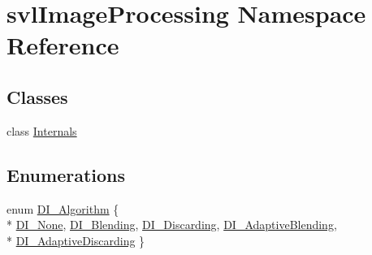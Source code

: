 \hypertarget{namespacesvl_image_processing}{}\section{svl\+Image\+Processing Namespace Reference}
\label{namespacesvl_image_processing}
\subsection*{Classes}
\begin{DoxyCompactItemize}
\item 
class \hyperlink{classsvl_image_processing_1_1_internals}{Internals}
\end{DoxyCompactItemize}
\subsection*{Enumerations}
\begin{DoxyCompactItemize}
\item 
enum \hyperlink{namespacesvl_image_processing_a52b75591f8aa2cf8a2b4ea843b2f864a}{D\+I\+\_\+\+Algorithm} \{ \\*
\hyperlink{namespacesvl_image_processing_a52b75591f8aa2cf8a2b4ea843b2f864aa73d04fb676b1d8a4eb2e107629637e10}{D\+I\+\_\+\+None}, 
\hyperlink{namespacesvl_image_processing_a52b75591f8aa2cf8a2b4ea843b2f864aa228be787d8eacef51545d7b0e5d834c6}{D\+I\+\_\+\+Blending}, 
\hyperlink{namespacesvl_image_processing_a52b75591f8aa2cf8a2b4ea843b2f864aa8c3cd58f7894507f4629c50b465d8623}{D\+I\+\_\+\+Discarding}, 
\hyperlink{namespacesvl_image_processing_a52b75591f8aa2cf8a2b4ea843b2f864aae669a1776585899a84ae392a39a02ddb}{D\+I\+\_\+\+Adaptive\+Blending}, 
\\*
\hyperlink{namespacesvl_image_processing_a52b75591f8aa2cf8a2b4ea843b2f864aa7c0ad13a0502df7b0ebef799a51d9c4e}{D\+I\+\_\+\+Adaptive\+Discarding}
 \}
\end{DoxyCompactItemize}

